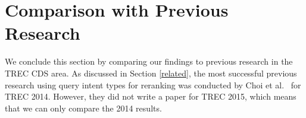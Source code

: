 %
%
%

\section{Comparison with Previous Research}
We conclude this section by comparing our findings to previous research in the TREC CDS area.
As discussed in Section \ref{related}, the most successful previous research using query intent types for reranking
was conducted by Choi et al.~\cite{choi} for TREC 2014. However, they did not write a paper for TREC 2015,
which means that we can only compare the 2014 results.

